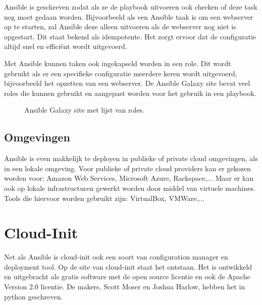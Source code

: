 Ansible is geschreven zodat als ze de playbook uitvoeren ook checken of deze task nog moet gedaan worden. Bijvoorbeeld als een Ansible taak is om een webserver op te starten, zal Ansible deze alleen uitvoeren als de webserver nog niet is opgestart. Dit staat bekend als idempotente. Het zorgt ervoor dat de configuratie altijd snel en efficiënt wordt uitgevoerd.

Met Ansible kunnen taken ook ingekapseld worden in een role. Dit wordt gebruikt als er een specifieke configuratie meerdere keren wordt uitgevoerd, bijvoorbeeld het opzetten van een webserver. De Ansible Galaxy site bevat veel roles die kunnen gebruikt en aangepast worden voor het gebruik in een playbook.
\begin{figure}[!htb]
    \caption{Ansible Galaxy site met lijst van roles.}
    \label{fig:agalaxy}
\end{figure}


\subsection{Omgevingen}
Ansible is even makkelijk te deployen in publieke of private cloud omgevingen, als in een lokale omgeving. Voor publieke of private cloud providers kan er gekozen worden voor: Amazon Web Services, Microsoft Azure, Rackspace,... Maar er kan ook op lokale infrastructuren gewerkt worden door middel van virtuele machines. Tools die hiervoor worden gebruikt zijn: VirtualBox, VMWare,...

\section{Cloud-Init}
Net als Ansible is cloud-init ook een soort van configuration manager en deployment tool. Op de site van cloud-init \autocite{cloudsite} staat het ontstaan. Het is ontwikkeld en uitgebracht als gratis software met de open source licentie en ook de Apache Version 2.0 licentie. De makers, Scott Moser en Joshua Harlow, hebben het in python geschreven.

